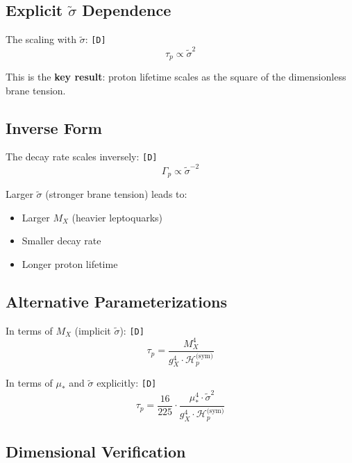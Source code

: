 \documentclass[11pt,a4paper]{article}
\newcommand{\tagD}{\textcolor{green!50!black}{\texttt{[D]}}}
\theoremstyle{definition}
\begin{document}
\subsection{Explicit $\tilde{\sigma}$ Dependence}
\label{subsec:sigma-dependence}

The scaling with $\tilde{\sigma}$: \tagD{}
\begin{equation}
\label{eq:sigma-scaling}
\boxed{\tau_p \propto \tilde{\sigma}^2}
\end{equation}

This is the \textbf{key result}: proton lifetime scales as the square of the
dimensionless brane tension.

\subsection{Inverse Form}
\label{subsec:inverse-form}

The decay rate scales inversely: \tagD{}
\begin{equation}
\label{eq:rate-scaling}
\Gamma_p \propto \tilde{\sigma}^{-2}
\end{equation}

Larger $\tilde{\sigma}$ (stronger brane tension) leads to:
\begin{itemize}
  \item Larger $M_X$ (heavier leptoquarks)
  \item Smaller decay rate
  \item Longer proton lifetime
\end{itemize}

\subsection{Alternative Parameterizations}
\label{subsec:alternative-param}

In terms of $M_X$ (implicit $\tilde{\sigma}$): \tagD{}
\begin{equation}
\label{eq:taup-mx-form}
\tau_p = \frac{M_X^4}{g_X^4 \cdot \mathcal{H}_p^{\text{(sym)}}}
\end{equation}

In terms of $\mu_*$ and $\tilde{\sigma}$ explicitly: \tagD{}
\begin{equation}
\label{eq:taup-explicit}
\tau_p = \frac{16}{225} \cdot \frac{\mu_*^4 \cdot \tilde{\sigma}^2}{g_X^4 \cdot \mathcal{H}_p^{\text{(sym)}}}
\end{equation}

\subsection{Dimensional Verification}
\label{subsec:dimensional-check}
\end{document}
